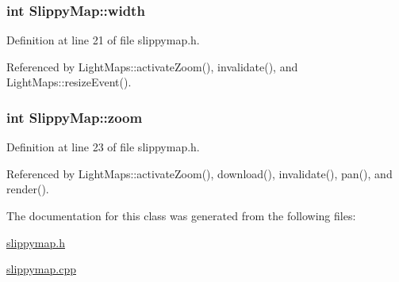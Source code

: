 \hypertarget{classSlippyMap_ada3532095a8c4083e9da3db17de29fc1}{
\subsubsection[{width}]{\setlength{\rightskip}{0pt plus 5cm}int Slippy\-Map\-::width}}\label{classSlippyMap_ada3532095a8c4083e9da3db17de29fc1}


Definition at line 21 of file slippymap.\-h.



Referenced by Light\-Maps\-::activate\-Zoom(), invalidate(), and Light\-Maps\-::resize\-Event().

\hypertarget{classSlippyMap_a13dcc9915570a1a333c1e9275ffe64b3}{
\subsubsection[{zoom}]{\setlength{\rightskip}{0pt plus 5cm}int Slippy\-Map\-::zoom}}\label{classSlippyMap_a13dcc9915570a1a333c1e9275ffe64b3}


Definition at line 23 of file slippymap.\-h.



Referenced by Light\-Maps\-::activate\-Zoom(), download(), invalidate(), pan(), and render().



The documentation for this class was generated from the following files\-:\begin{DoxyCompactItemize}
\item 
\hyperlink{slippymap_8h}{slippymap.\-h}\item 
\hyperlink{slippymap_8cpp}{slippymap.\-cpp}\end{DoxyCompactItemize}

